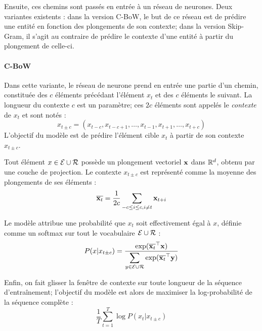 
Ensuite, ces chemins sont passés en entrée à un réseau de neurones. Deux variantes existents : dans la version C-BoW, le but de ce réseau est de prédire une entité en fonction des plongements de son contexte; dans la version Skip-Gram, il s'agit au contraire de prédire le contexte d'une entité à partir du plongement de celle-ci.

\paragraph{C-BoW}

Dans cette variante, le réseau de neurone prend en entrée une partie d'un chemin, constituée des $c$ éléments précédant l'élément $x_t$ et des $c$ éléments le suivant. La longueur du contexte $c$ est un paramètre; ces $2c$ éléments sont appelés le \textit{contexte} de $x_t$ et sont notés :
\begin{equation}
    x_{t \pm c} = (x_{t-c}, x_{t-c+1}, \ldots, x_{t-1}, x_{t+1}, \ldots, x_{t+c})
\end{equation}
L'objectif du modèle est de prédire l'élément cible $x_t$ à partir de son contexte $x_{t \pm c}$.

Tout élément $x \in \Ent \cup \Rel$ possède un plongement vectoriel $\bf{x}$ dans $\R^d$, obtenu par une couche de projection. Le contexte $x_{t \pm c}$ est représenté comme la moyenne des plongements de ses éléments :
\begin{equation}
    \compconj{\bf{x}_t} = \frac{1}{2c} \sum_{-c \leq i \leq c, i \neq t} \bf{x}_{t+i}
\end{equation}

Le modèle attribue une probabilité que $x_t$ soit effectivement égal à $x$, définie comme un softmax sur tout le vocabulaire $\Ent \cup \Rel$ :
\begin{equation}
    P(x | x_{t \pm c}) = \frac{\displaystyle \exp(\compconj{\bf{x}_t}^\top \bf{x})}{\displaystyle \sum_{y \in \Ent \cup \Rel} \exp(\compconj{\bf{x}_t}^\top \bf{y})}
\end{equation}

Enfin, on fait glisser la fenêtre de contexte sur toute longueur de la séquence d'entraînement; l'objectif du modèle est alors de maximiser la log-probabilité de la séquence complète :
\begin{equation}
    \frac{1}{T} \sum_{t = 1}^{T} \log P(x_t | x_{t \pm c})
\end{equation}

